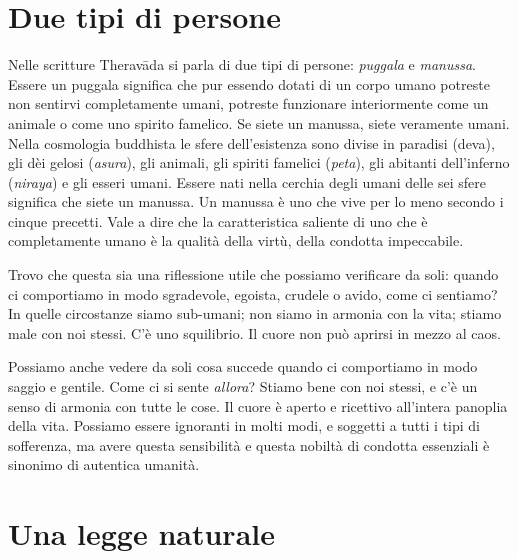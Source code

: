 \section*{Due tipi di persone}

\vspace*{-0.8em}
Nelle scritture Theravāda si parla di due tipi di persone: \textit{puggala} e \textit{manussa}. Essere un puggala significa che pur essendo dotati di un corpo umano potreste non sentirvi completamente umani, potreste funzionare interiormente come un animale o come uno spirito famelico. Se siete un manussa, siete veramente umani. Nella cosmologia buddhista le sfere dell'esistenza sono divise in paradisi (deva), gli dèi gelosi (\textit{asura}), gli animali, gli spiriti famelici (\textit{peta}), gli abitanti dell'inferno (\textit{niraya}) e gli esseri umani. Essere nati nella cerchia degli umani delle sei sfere significa che siete un manussa. Un manussa è uno che vive per lo meno secondo i cinque precetti. Vale a dire che la caratteristica saliente di uno che è completamente umano è la qualità della virtù, della condotta impeccabile.

Trovo che questa sia una riflessione utile che possiamo verificare da soli: quando ci comportiamo in modo sgradevole, egoista, crudele o avido, come ci sentiamo? In quelle circostanze siamo sub-umani; non siamo in armonia con la vita; stiamo male con noi stessi. C'è uno squilibrio. Il cuore non può aprirsi in mezzo al caos.

Possiamo anche vedere da soli cosa succede quando ci comportiamo in modo saggio e gentile. Come ci si sente \textit{allora}? Stiamo bene con noi stessi, e c'è un senso di armonia con tutte le cose. Il cuore è aperto e ricettivo all'intera panoplia della vita. Possiamo essere ignoranti in molti modi, e soggetti a tutti i tipi di sofferenza, ma avere questa sensibilità e questa nobiltà di condotta essenziali è sinonimo di autentica umanità.

\section*{Una legge naturale}

